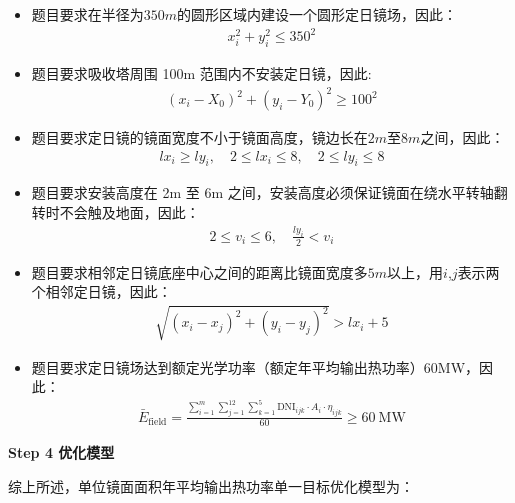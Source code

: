 \documentclass[../main.tex]{subfiles}
\begin{document}
\begin{itemize}
    \item 题目要求在半径为$350m$的圆形区域内建设一个圆形定日镜场，因此：
  \begin{align}\label{2.3}
x_i^2 + y_i^2 \leq 350^2
  \end{align}
    \item 题目要求吸收塔周围 100m 范围内不安装定日镜，因此:
      \begin{align}\label{2.4}
(x_i - X_0)^2 + (y_i - Y_0)^2 \geq 100^2
  \end{align}
    \item 题目要求定日镜的镜面宽度不小于镜面高度，镜边长在$2m$至$8m$之间，因此：
      \begin{align}\label{2.5}
lx_i \geq ly_{i}, \quad 2 \leq lx_i\leq 8, \quad 2 \leq ly_i \leq 8
  \end{align}
    \item 题目要求安装高度在 2m 至 6m 之间，安装高度必须保证镜面在绕水平转轴翻转时不会触及地面，因此：     
     \begin{align}\label{2.6}
2 \leq v_i \leq 6, \quad \frac{ly_i}{2} < v_i
  \end{align}
    \item 题目要求相邻定日镜底座中心之间的距离比镜面宽度多$5m$以上，用$i$,$j$表示两个相邻定日镜，因此：     
      \begin{align}\label{2.7}
\sqrt{(x_i - x_j)^2 + (y_i - y_j)^2} > lx_i + 5
  \end{align}
\item 题目要求定日镜场达到额定光学功率（额定年平均输出热功率）60MW，因此：       
 \begin{align}\label{2.8}
\bar{E}_{\text{field}} = \frac{\sum_{i=1}^{m} \sum_{j=1}^{12} \sum_{k=1}^{5} \text{DNI}_{ijk} \cdot A_i \cdot \eta_{ijk}}{60} \geq 60\ \text{MW}
  \end{align}
 
\end{itemize}
\noindent \textbf{Step 4 优化模型}
\par 综上所述，单位镜面面积年平均输出热功率单一目标优化模型为：
\end{document}
